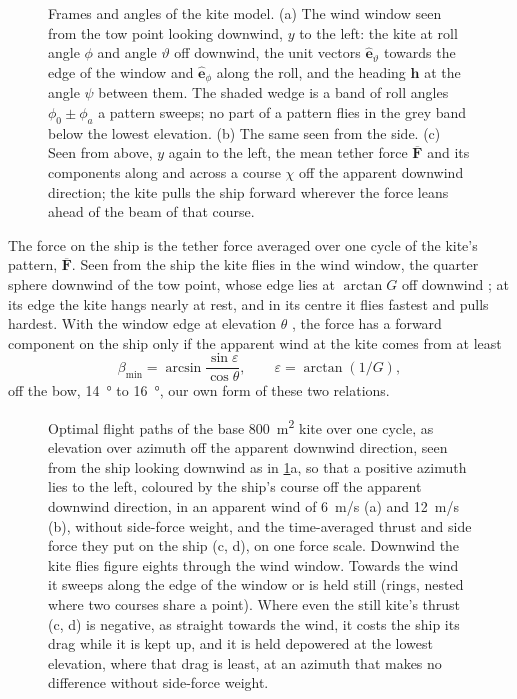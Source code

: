 \begin{figure}[tbp]
\centering
{}
\caption{Frames and angles of the kite model. (a) The wind window seen from the tow point looking downwind, $y$ to the left: the kite at roll angle $\phi$ and angle $\vartheta$ off downwind, the unit vectors $\hat{\mathbf e}_\vartheta$ towards the edge of the window and $\hat{\mathbf e}_\phi$ along the roll, and the heading $\hat{\mathbf h}$ at the angle $\psi$ between them. The shaded wedge is a band of roll angles $\phi_0\pm\phi_a$ a pattern sweeps; no part of a pattern flies in the grey band below the lowest elevation. (b) The same seen from the side. (c) Seen from above, $y$ again to the left, the mean tether force $\overline{\mathbf F}$ and its components along and across a course $\chi$ off the apparent downwind direction; the kite pulls the ship forward wherever the force leans ahead of the beam of that course.}
\label{fig:kite_frames}
\end{figure}

The force on the ship is the tether force averaged over one cycle of the kite's pattern, $\overline{\mathbf F}$. Seen from the ship the kite flies in the wind window, the quarter sphere downwind of the tow point, whose edge lies at $\arctan G$ off downwind \citep{erhard2013}; at its edge the kite hangs nearly at rest, and in its centre it flies fastest and pulls hardest. With the window edge at elevation $\theta$ \citep{bigi2018}, the force has a forward component on the ship only if the apparent wind at the kite comes from at least
\begin{equation}
\beta_\mathrm{min}=\arcsin\frac{\sin\varepsilon}{\cos\theta}, \qquad \varepsilon=\arctan(1/G),
\label{eq:upwind_limit}
\end{equation}
off the bow, \SI{14}{\degree} to \SI{16}{\degree}, our own form of these two relations.

\begin{figure}[tbp]
\centering
{}
\caption{Optimal flight paths of the base \SI{800}{m^2} kite over one cycle, as elevation over azimuth off the apparent downwind direction, seen from the ship looking downwind as in \cref{fig:kite_frames}a, so that a positive azimuth lies to the left, coloured by the ship's course off the apparent downwind direction, in an apparent wind of \SI{6}{m/s} (a) and \SI{12}{m/s} (b), without side-force weight, and the time-averaged thrust and side force they put on the ship (c, d), on one force scale. Downwind the kite flies figure eights through the wind window. Towards the wind it sweeps along the edge of the window or is held still (rings, nested where two courses share a point). Where even the still kite's thrust (c, d) is negative, as straight towards the wind, it costs the ship its drag while it is kept up, and it is held depowered at the lowest elevation, where that drag is least, at an azimuth that makes no difference without side-force weight. }
\label{fig:patterns}
\end{figure}

